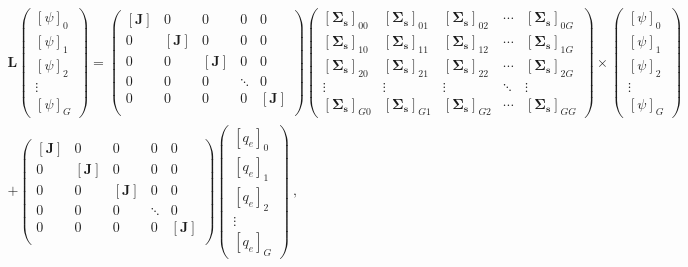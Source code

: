 \documentclass[12pt,twoside]{article}
\newcommand{\ve}[1]{\ensuremath{\mathbf{#1}}}
\begin{document}
\begin{multline}
    \ve{L}
    \begin{pmatrix}
      [\psi]_0 \\
      [\psi]_1 \\
      [\psi]_2 \\
      \vdots   \\
      [\psi]_G
    \end{pmatrix} =
    \begin{pmatrix}
      [\ve{J}] & 0 & 0 & 0 & 0 \\
      0 & [\ve{J}] & 0 & 0 & 0 \\
      0 & 0 & [\ve{J}] & 0 & 0 \\
      0 & 0 & 0 & \ddots & 0 \\
      0 & 0 & 0 & 0 & [\ve{J}] \\
    \end{pmatrix}
    \begin{pmatrix}
      [\ve{\Sigma_s}]_{00} & [\ve{\Sigma_s}]_{01} & [\ve{\Sigma_s}]_{02} & \cdots &
      [\ve{\Sigma_s}]_{0G} \\
      [\ve{\Sigma_s}]_{10} & [\ve{\Sigma_s}]_{11} & [\ve{\Sigma_s}]_{12} & \cdots &
      [\ve{\Sigma_s}]_{1G} \\
      [\ve{\Sigma_s}]_{20} & [\ve{\Sigma_s}]_{21} & [\ve{\Sigma_s}]_{22} & \cdots &
      [\ve{\Sigma_s}]_{2G} \\
      \vdots & \vdots & \vdots & \ddots & \vdots \\
      [\ve{\Sigma_s}]_{G0} & [\ve{\Sigma_s}]_{G1} & [\ve{\Sigma_s}]_{G2} & \cdots &
      [\ve{\Sigma_s}]_{GG}
    \end{pmatrix}
    \times
    \begin{pmatrix}
      [\psi]_0 \\
      [\psi]_1 \\
      [\psi]_2 \\
      \vdots   \\
      [\psi]_G
    \end{pmatrix}\\
    +
    \begin{pmatrix}
      [\ve{J}] & 0 & 0 & 0 & 0 \\
      0 & [\ve{J}] & 0 & 0 & 0 \\
      0 & 0 & [\ve{J}] & 0 & 0 \\
      0 & 0 & 0 & \ddots & 0 \\
      0 & 0 & 0 & 0 & [\ve{J}] \\
    \end{pmatrix}
    \begin{pmatrix}
      [q_e]_0 \\
      [q_e]_1 \\
      [q_e]_2 \\
      \vdots   \\
      [q_e]_G
    \end{pmatrix}\:,
    \label{eq:matrix-transport}
\end{multline}
\end{document}
